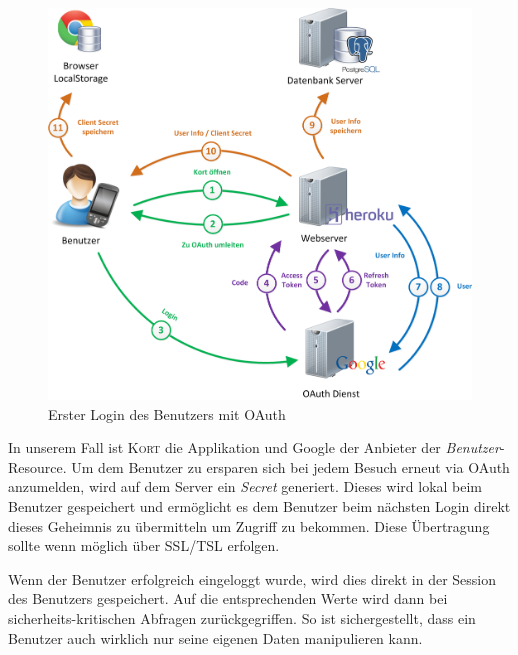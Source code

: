 \begin{figure}[H]
	\centering
	\includegraphics[width=\textwidth]{images/implementation/backend/kort-login}
	\caption{Erster Login des Benutzers mit OAuth}
	\label{image-kort-login}
\end{figure}

In unserem Fall ist \textsc{Kort} die Applikation und Google der Anbieter der \emph{Benutzer}-Resource.
Um dem Benutzer zu ersparen sich bei jedem Besuch erneut via OAuth anzumelden, wird auf dem Server ein \emph{Secret} generiert.
Dieses wird lokal beim Benutzer gespeichert und ermöglicht es dem Benutzer beim nächsten Login direkt dieses Geheimnis zu übermitteln um Zugriff zu bekommen.
Diese Übertragung sollte wenn möglich über SSL/TSL erfolgen.

Wenn der Benutzer erfolgreich eingeloggt wurde, wird dies direkt in der Session des Benutzers gespeichert.
Auf die entsprechenden Werte wird dann bei sicherheits-kritischen Abfragen zurückgegriffen.
So ist sichergestellt, dass ein Benutzer auch wirklich nur seine eigenen Daten manipulieren kann.

